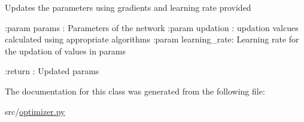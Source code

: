 \begin{DoxyVerb}Updates the parameters using gradients and learning rate provided

:param params   : Parameters of the network
:param updation    : updation valcues calculated using appropriate algorithms
:param learning_rate: Learning rate for the updation of values in params

:return : Updated params 
\end{DoxyVerb}
 

The documentation for this class was generated from the following file\+:\begin{DoxyCompactItemize}
\item 
src/\mbox{\hyperlink{optimizer_8py}{optimizer.\+py}}\end{DoxyCompactItemize}
